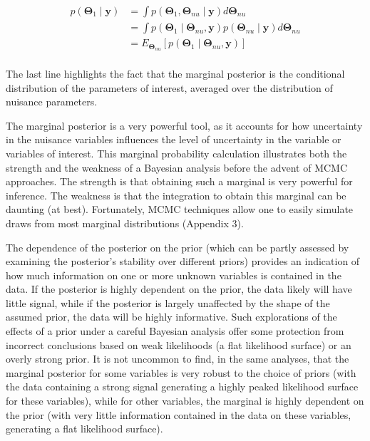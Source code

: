 \documentclass{article}
\begin{document}
\begin{equation}
\begin{aligned}p(\boldsymbol{\Theta}_{1}\mid\mathbf{y})&=\int p(\boldsymbol{\Theta}_{1},\boldsymbol{\Theta}_{nu}\mid\mathbf{y})d\boldsymbol{\Theta}_{nu}\\&=\int p(\boldsymbol{\Theta}_{1}\mid\boldsymbol{\Theta}_{nu},\mathbf{y})p(\boldsymbol{\Theta}_{nu}\mid\mathbf{y})d\boldsymbol{\Theta}_{nu}\\&=E_{\boldsymbol{\Theta}_{nu}}\left[p(\boldsymbol{\Theta}_{1}\mid\boldsymbol{\Theta}_{nu},\mathbf{y})\right]\\ \end{aligned}
\tag{19.30}
\label{eq:19_30}
\end{equation}

The last line highlights the fact that the marginal posterior is the conditional distribution of the parameters of interest, averaged over the distribution of nuisance parameters.

The marginal posterior is a very powerful tool, as it accounts for how uncertainty in the nuisance variables influences the level of uncertainty in the variable or variables of interest. This marginal probability calculation illustrates both the strength and the weakness of a Bayesian analysis before the advent of MCMC approaches. The strength is that obtaining such a marginal is very powerful for inference. The weakness is that the integration to obtain this marginal can be daunting (at best). Fortunately, MCMC techniques allow one to easily simulate draws from most marginal distributions (Appendix 3).

The dependence of the posterior on the prior (which can be partly assessed by examining the posterior's stability over different priors) provides an indication of how much information on one or more unknown variables is contained in the data. If the posterior is highly dependent on the prior, the data likely will have little signal, while if the posterior is largely unaffected by the shape of the assumed prior, the data will be highly informative. Such explorations of the effects of a prior under a careful Bayesian analysis offer some protection from incorrect conclusions based on weak likelihoods (a flat likelihood surface) or an overly strong prior. It is not uncommon to find, in the same analyses, that the marginal posterior for some variables is very robust to the choice of priors (with the data containing a strong signal generating a highly peaked likelihood surface for these variables), while for other variables, the marginal is highly dependent on the prior (with very little information contained in the data on these variables, generating a flat likelihood surface).
\end{document}
